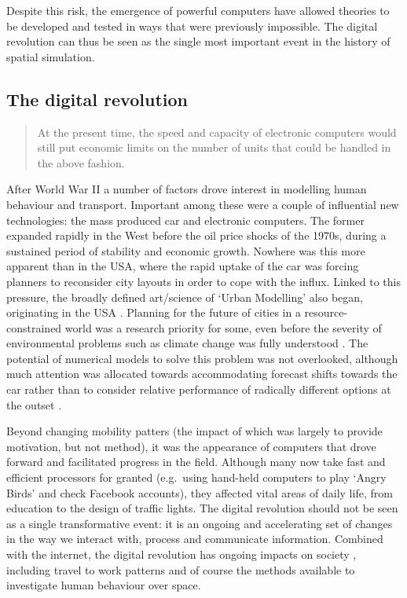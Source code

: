 Despite this risk, the emergence of powerful computers have allowed theories to
be developed and tested in ways that were previously impossible. The digital
revolution can thus be seen as the single most important event in the history
of spatial simulation.

\subsection{The digital revolution}
\label{s:digirev}
\begin{quote}
 At the present time, the speed and capacity
of electronic computers would still put economic limits on the number of units
that could be handled in the above fashion.
\end{quote}

After World War II a number of factors drove interest in modelling human
behaviour and transport. Important among these were a couple of influential new
technologies: the mass produced car and electronic computers. The former
expanded rapidly in the West before the oil price shocks of the
1970s, during a sustained period of stability and economic growth. Nowhere
was this more apparent than in the USA, where the rapid uptake of the car was
forcing planners to reconsider city layouts in order to cope with the influx.
Linked to this pressure, the broadly defined art/science of `Urban Modelling'
also
began, originating in the USA \citep{batty1976urban}. Planning for the future
of cities in a resource-constrained world was a research priority for some,
even before the severity of environmental problems such as climate change was
fully understood \citep{Rouse1975}. The potential of numerical models to solve
this problem was
not overlooked, although much attention was allocated towards accommodating
forecast shifts 
towards the car rather than to consider relative performance of
radically different options at the outset \citep{manheim1968search, TUI1972}.

Beyond changing mobility patters (the impact of which was largely to provide
motivation, but not method), it was the appearance of computers that drove
forward and facilitated progress in the field. Although many now
take fast and efficient processors for granted (e.g.~using hand-held computers
to play `Angry Birds' and check Facebook accounts), they affected vital areas of
daily life, from
education to the design of traffic lights. The digital revolution should not
be seen as a single transformative event: it is an ongoing and accelerating
set of changes in the way we interact with, process and communicate
information. Combined with the internet, the digital revolution has ongoing
impacts on society \citep{Rushkoff2011}, including travel to work patterns
\citep{Orloff2003} and of course the methods available to investigate human
behaviour over space.

